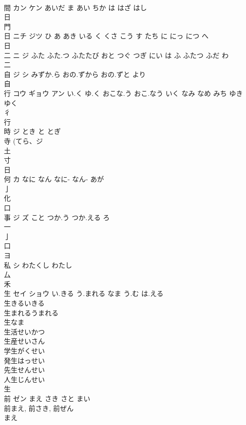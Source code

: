 \documentclass[8pt]{extreport}
\begin{document}
\begin{CJK}{UTF8}{min}
\\	間	カン ケン	あいだ ま あい ちか は はざ はし	
\\	日 
\\	門 
\\	日	ニチ ジツ	ひ あ あき いる く くさ こう す たち に にっ につ へ	
\\	日 
\\	二	ニ ジ	ふた ふた.つ ふたたび おと つぐ つぎ にい は ふ ふたつ ふだ わ	
\\	二 
\\	自	ジ シ	みずか.ら おの.ずから おの.ずと より	
\\	自 
\\	行	コウ ギョウ アン	い.く ゆ.く おこな.う おこ.なう いく なみ なめ みち ゆき ゆく	
\\	彳 
\\	行 
\\	時	ジ	とき と とぎ	
\\	寺 (てら、ジ 
\\	土 
\\	寸 
\\	日 
\\	何	カ	なに なん なに- なん- あが	
\\	亅 
\\	化 
\\	口 
\\	事	ジ ズ	こと つか.う つか.える ろ	
\\	一 
\\	亅 
\\	口 
\\	ヨ	
\\	私	シ	わたくし わたし	
\\	厶 
\\	禾 
\\	生	セイ ショウ	い.きる う.まれる なま う.む は.える	
\\	生きるいきる 
\\	生まれるうまれる 
\\	生なま 
\\	生活せいかつ 
\\	生産せいさん 
\\	学生がくせい 
\\	発生はっせい 
\\	先生せんせい 
\\	人生じんせい 
\\	生 
\\	前	ゼン	まえ さき さと まい	
\\	前まえ, 前さき, 前ぜん 
\\	まえ 

\end{CJK}
\end{document}
